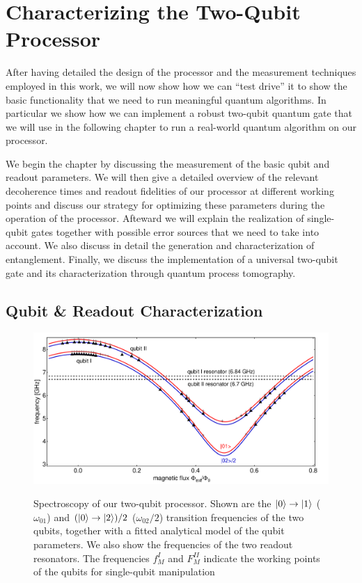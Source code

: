 \chapter{Characterizing the Two-Qubit Processor} \label{chapter:processor_characterization}

After having detailed the design of the processor and the measurement techniques employed in this work, we will now show how we can ``test drive'' it to show the basic functionality that we need to run meaningful quantum algorithms. In particular we show how we can implement a robust two-qubit quantum gate that we will use in the following chapter to run a real-world quantum algorithm on our processor.

\smallskip

We begin the chapter by discussing the measurement of the basic qubit and readout parameters. We will then give a detailed overview of the relevant decoherence times and readout fidelities of our processor at different working points and discuss our strategy for optimizing these parameters during the operation of the processor. Afteward we will explain the realization of single-qubit gates together with possible error sources that we need to take into account. We also discuss in detail the generation and characterization of entanglement. Finally, we discuss the implementation of a universal two-qubit gate and its characterization through quantum process tomography.

\section{Qubit \& Readout Characterization}

\begin{figure}[ht!]
	\centering
		\includegraphics[width=1.\textwidth]{"./data/ct5/qubit frequencies/qubit_spectroscopy"}
	\label{fig:ProcessorSpectroscopy}
	\caption[Spectroscopy of the Two-Qubit Processor]{Spectroscopy of our two-qubit processor. Shown are the $\left| 0 \right>\to\left| 1 \right>$ ($\omega_{01}$) and $(\left| 0 \right>\to\left| 2 \right>)/2$ ($\omega_{02}/2$) transition frequencies of the two qubits, together with a fitted analytical model of the qubit parameters. We also show the frequencies of the two readout resonators. The frequencies $f_M^{I}$ and $F_M^{II}$ indicate the working points of the qubits for single-qubit manipulation }
\end{figure}

